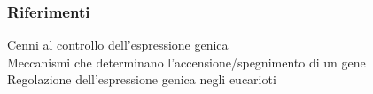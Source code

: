 \documentclass[hyperref={pdfpagelabels=false}]{beamer}
\begin{document}
\begin{frame}\frametitle{Riferimenti}
\href{https://github.com/Samnitium/WEB-gene-expression/raw/master/presentazione\%20finale/support/gene_expression_1.pdf}{} Cenni al controllo dell'espressione genica\\
\bigskip
\href{https://github.com/Samnitium/WEB-gene-expression/raw/master/presentazione\%20finale/support/gene_expression_2.pdf}{} Meccanismi che determinano l'accensione/spegnimento di un gene\\
\bigskip
\href{https://github.com/Samnitium/WEB-gene-expression/raw/master/presentazione\%20finale/support/gene_expression_3.pdf}{} Regolazione dell'espressione genica negli eucarioti

\end{frame}
\end{document}
